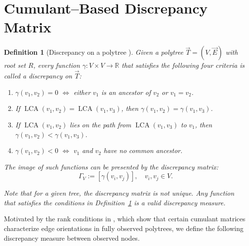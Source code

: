 \documentclass[11pt,a4paper]{article}
\numberwithin{equation}{section}
\newtheorem{definition}[theorem]{Definition}
\begin{document}
\section{Cumulant--Based Discrepancy Matrix}
\label{sec:discrepancy}
\begin{definition}[Discrepancy on a polytree {\citealp[Def.~7]{etesami:kiyavash:coleman:2016}}]
\label{def:discrepancy_paper1}
Given a polytree $\vec T=(V,\vec E)$ with root set $R$, every function 
$\gamma:V\times V\to\mathbb R$ that satisfies the following four criteria 
is called a \emph{discrepancy} on $\vec T$:
\begin{enumerate}[label=(\arabic*)]
  \item $\gamma(v_1,v_2)=0$ $\iff$ either $v_1$ is an ancestor of $v_2$ or $v_1=v_2$.
  \item If $\operatorname{LCA}(v_1,v_2)=\operatorname{LCA}(v_1,v_3)$, then $\gamma(v_1,v_2)=\gamma(v_1,v_3)$.
  \item If $\operatorname{LCA}(v_1,v_2)$ lies on the path from $\operatorname{LCA}(v_1,v_3)$ to $v_1$, then $\gamma(v_1,v_2) < \gamma(v_1,v_3)$.
  \item $\gamma(v_1,v_2)<0$ $\iff$ $v_1$ and $v_2$ have no common ancestor.
\end{enumerate}

The image of such functions can be presented by the discrepancy matrix:
\[
  \Gamma_V := \left[ \gamma(v_i, v_j) \right], \quad v_i, v_j \in V.
\]

Note that for a given tree, the discrepancy matrix is not unique. Any function that satisfies the conditions in Definition~\ref{def:discrepancy_paper1} is a valid discrepancy measure.

\end{definition}
Motivated by the rank conditions in \citet[Prop.~2.10]{tramontano:monod:drton:2022}, which show that certain cumulant matrices characterize edge orientations in fully observed polytrees, we define the following discrepancy measure between observed nodes.
\end{document}
